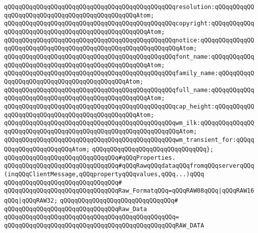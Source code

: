 \verb|qQQqqQQqqQQqqQQqqQQqqQQqqQQqqQQqqQQqqQQqqQQqqQQqresolution:qQQqqQQqqQQqqQQqqQQqqQQqqQQqqQQqqQQqqQQqqQQqqQQqAtom;|\newline
\verb|qQQqqQQqqQQqqQQqqQQqqQQqqQQqqQQqqQQqqQQqqQQqqQQqcopyright:qQQqqQQqqQQqqQQqqQQqqQQqqQQqqQQqqQQqqQQqqQQqqQQqqQQqAtom;|\newline
\verb|qQQqqQQqqQQqqQQqqQQqqQQqqQQqqQQqqQQqqQQqqQQqqQQqnotice:qQQqqQQqqQQqqQQqqQQqqQQqqQQqqQQqqQQqqQQqqQQqqQQqqQQqqQQqqQQqqQQqAtom;|\newline
\verb|qQQqqQQqqQQqqQQqqQQqqQQqqQQqqQQqqQQqqQQqqQQqqQQqfont_name:qQQqqQQqqQQqqQQqqQQqqQQqqQQqqQQqqQQqqQQqqQQqqQQqqQQqAtom;|\newline
\verb|qQQqqQQqqQQqqQQqqQQqqQQqqQQqqQQqqQQqqQQqqQQqqQQqfamily_name:qQQqqQQqqQQqqQQqqQQqqQQqqQQqqQQqqQQqqQQqqQQqAtom;|\newline
\verb|qQQqqQQqqQQqqQQqqQQqqQQqqQQqqQQqqQQqqQQqqQQqqQQqfull_name:qQQqqQQqqQQqqQQqqQQqqQQqqQQqqQQqqQQqqQQqqQQqqQQqqQQqAtom;|\newline
\verb|qQQqqQQqqQQqqQQqqQQqqQQqqQQqqQQqqQQqqQQqqQQqqQQqcap_height:qQQqqQQqqQQqqQQqqQQqqQQqqQQqqQQqqQQqqQQqqQQqqQQqAtom;|\newline
\verb|qQQqqQQqqQQqqQQqqQQqqQQqqQQqqQQqqQQqqQQqqQQqqQQqwm_ilk:qQQqqQQqqQQqqQQqqQQqqQQqqQQqqQQqqQQqqQQqqQQqqQQqqQQqqQQqqQQqqQQqAtom;|\newline
\verb|qQQqqQQqqQQqqQQqqQQqqQQqqQQqqQQqqQQqqQQqqQQqqQQqwm_transient_for:qQQqqQQqqQQqqQQqqQQqqQQqAtom;|\newline
\verb|qQQqqQQqqQQqqQQqqQQqqQQqqQQqqQQq};|\newline
\newline
\verb|qQQqqQQqqQQqqQQqqQQqqQQqqQQqqQQq#qQQqProperties.|\newline
\newline
\verb|qQQqqQQqqQQqqQQqqQQqqQQqqQQqqQQq#qQQqRawqQQqdataqQQqfromqQQqserverqQQq(inqQQqClientMessage,qQQqpropertyqQQqvalues,qQQq...)qQQq|\newline
\verb|qQQqqQQqqQQqqQQqqQQqqQQqqQQqqQQq#|\newline
\verb|qQQqqQQqqQQqqQQqqQQqqQQqqQQqqQQqRaw_FormatqQQq=qQQqRAW08qQQq|\verb#|qQQqRAW16qQQq|qQQqRAW32;#\newline
\verb|qQQqqQQqqQQqqQQqqQQqqQQqqQQqqQQq#|\newline
\verb|qQQqqQQqqQQqqQQqqQQqqQQqqQQqqQQqRaw_Data|\newline
\verb|qQQqqQQqqQQqqQQqqQQqqQQqqQQqqQQqqQQqqQQqqQQqqQQq=|\newline
\verb|qQQqqQQqqQQqqQQqqQQqqQQqqQQqqQQqqQQqqQQqqQQqqQQqRAW_DATA|\newline
